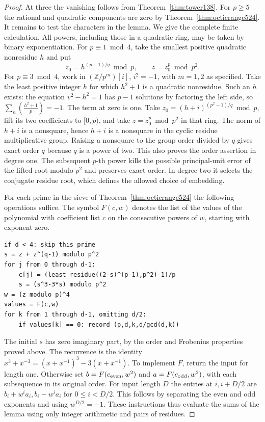 \documentclass[a4paper,11pt]{article}
\theoremstyle{definition}
\theoremstyle{remark}
\newcommand{\ZZ}{\mathbb Z}\newcommand{\ord}{\operatorname{ord}}
\numberwithin{equation}{section}
\begin{document}
\begin{proof}
At three the vanishing follows from Theorem~\ref{thm:tower138}.
For \(p\ge5\) the rational and quadratic components are zero by
Theorem~\ref{thm:octicrange524}. It remains to test the characters
in the lemma. We give the complete finite calculation. All powers,
including those in a quadratic ring, may be taken by binary
exponentiation. For \(p\equiv1\bmod4\), take the smallest positive
quadratic nonresidue \(h\) and put
\[
       z_0=h^{(p-1)/q}\bmod p,\qquad z=z_0^p\bmod p^2 .
\]
For \(p\equiv3\bmod4\), work in \((\ZZ/p^m)[i]\), \(i^2=-1\), with
\(m=1,2\) as specified. Take the least positive integer \(h\) for
which \(h^2+1\) is a quadratic nonresidue. Such an \(h\) exists:
the equation \(v^2-h^2=1\) has \(p-1\) solutions by factoring the
left side, so \(\sum_h (\frac{h^2+1}{p})=-1\). The term at zero is
one. Take \(z_0=(h+i)^{(p^2-1)/q}\bmod p\), lift its two
coefficients to \([0,p)\), and take \(z=z_0^p\bmod p^2\) in that
ring. The norm of \(h+i\) is a nonsquare, hence \(h+i\) is a
nonsquare in the cyclic residue multiplicative group. Raising a
nonsquare to the group order divided by \(q\) gives exact order
\(q\) because \(q\) is a power of two. This also proves the order
assertion in degree one. The subsequent \(p\)-th power kills the
possible principal-unit error of the lifted root modulo \(p^2\)
and preserves exact order. In degree two it selects the conjugate
residue root, which defines the allowed choice of embedding.

For each prime in the sieve of Theorem~\ref{thm:octicrange524} the
following operations suffice. The symbol \(F(c,w)\) denotes the
list of the values of the polynomial with coefficient list \(c\) on
the consecutive powers of \(w\), starting with exponent zero.
\begin{verbatim}
if d < 4: skip this prime
s = z + z^(q-1) modulo p^2
for j from 0 through d-1:
    c[j] = (least_residue((2-s)^(p-1),p^2)-1)/p
    s = (s^3-3*s) modulo p^2
w = (z modulo p)^4
values = F(c,w)
for k from 1 through d-1, omitting d/2:
    if values[k] == 0: record (p,d,k,d/gcd(d,k))
\end{verbatim}
The initial \(s\) has zero imaginary part, by the order and Frobenius
properties proved above. The recurrence is the identity
\(x^3+x^{-3}=(x+x^{-1})^3-3(x+x^{-1})\). To implement \(F\), return
the input for length one. Otherwise set \(b=F(c_{\rm even},w^2)\)
and \(a=F(c_{\rm odd},w^2)\), with each subsequence in its original
order. For input length \(D\) the entries at \(i,i+D/2\) are
\(b_i+w^i a_i,b_i-w^i a_i\) for \(0\le i<D/2\). This follows by
separating the even and odd exponents and using \(w^{D/2}=-1\).
These instructions thus evaluate the sums of the lemma using only
integer arithmetic and pairs of residues.


\end{proof}
\end{document}
